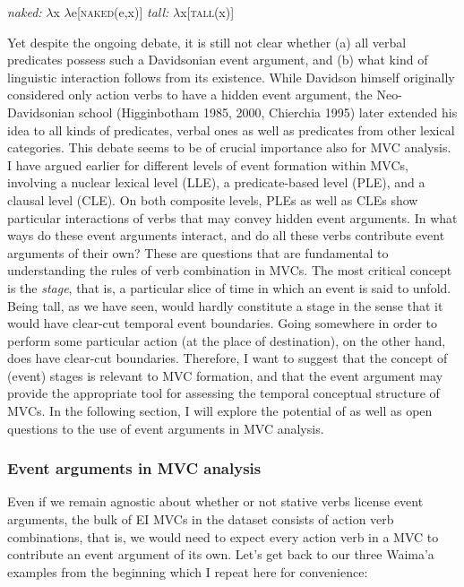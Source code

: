 \ea
\ea \textit{naked:} $\lambda$x $\lambda$e[\textsc{naked}(e,x)]
\ex \textit{tall:} $\lambda$x[\textsc{tall}(x)]
\z
\z

Yet despite the ongoing debate, it is still not clear whether (a) all verbal predicates possess such a Davidsonian event argument, and (b) what kind of linguistic interaction follows from its existence. While Davidson himself originally considered only action verbs to have a hidden event argument, the Neo-Davidsonian school (Higginbotham 1985, 2000, Chierchia 1995) later extended his idea to all kinds of predicates, verbal ones as well as predicates from other lexical categories. This debate seems to be of crucial importance also for MVC analysis. I have argued earlier for different levels of event formation within MVCs, involving a nuclear lexical level (LLE), a predicate-based level (PLE), and a clausal level (CLE). On both composite levels, PLEs as well as CLEs show particular interactions of verbs that may convey hidden event arguments. In what ways do these event arguments interact, and do all these verbs contribute event arguments of their own? These are questions that are fundamental to understanding the rules of verb combination in MVCs. The most critical concept is the \emph{stage}, that is, a particular slice of time in which an event is said to unfold. Being tall, as we have seen, would hardly constitute a stage in the sense that it would have clear-cut temporal event boundaries. Going somewhere in order to perform some particular action (at the place of destination), on the other hand, does have clear-cut boundaries. Therefore, I want to suggest that the concept of (event) stages is relevant to MVC formation, and that the event argument may provide the appropriate tool for assessing the temporal conceptual structure of MVCs. In the following section, I will explore the potential of as well as open questions to the use of event arguments in MVC analysis.

\subsubsection{Event arguments in MVC analysis}

Even if we remain agnostic about whether or not stative verbs license event arguments, the bulk of EI MVCs in the dataset consists of action verb combinations, that is, we would need to expect every action verb in a MVC to contribute an event argument of its own. Let's get back to our three Waima'a examples from the beginning which I repeat here for convenience:

